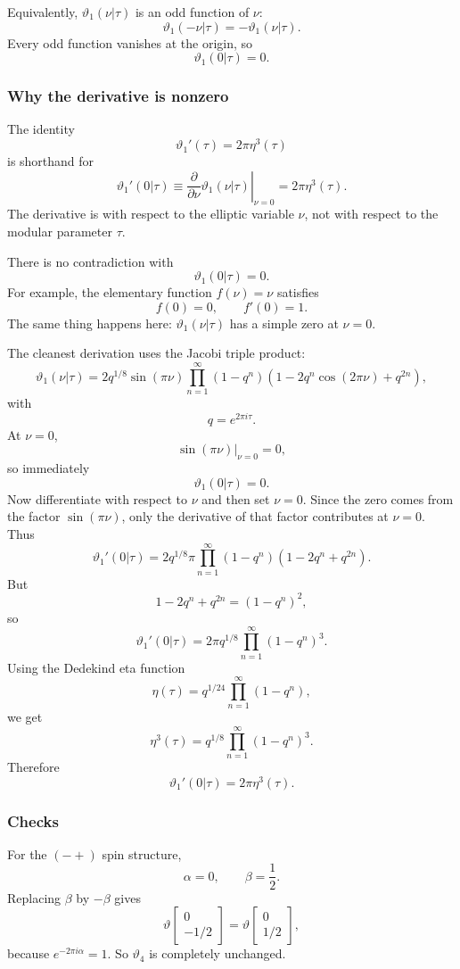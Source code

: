 \documentclass[
  10pt,
  a4paper,
  openany]{book}
\begin{document}
Equivalently, \(\vartheta_1(\nu|\tau)\) is an odd function of \(\nu\):
\[
\vartheta_1(-\nu|\tau)
=
-
\vartheta_1(\nu|\tau).
\] Every odd function vanishes at the origin, so \[
\vartheta_1(0|\tau)=0.
\]

\subsubsection{Why the derivative is
nonzero}\label{why-the-derivative-is-nonzero}

The identity \[
\vartheta_1'(\tau)=2\pi\eta^3(\tau)
\] is shorthand for \[
\vartheta_1'(0|\tau)
\equiv
\left.\frac{\partial}{\partial\nu}\vartheta_1(\nu|\tau)\right|_{\nu=0}
=
2\pi\eta^3(\tau).
\] The derivative is with respect to the elliptic variable \(\nu\), not
with respect to the modular parameter \(\tau\).

There is no contradiction with \[
\vartheta_1(0|\tau)=0.
\] For example, the elementary function \(f(\nu)=\nu\) satisfies \[
f(0)=0,
\qquad
f'(0)=1.
\] The same thing happens here: \(\vartheta_1(\nu|\tau)\) has a simple
zero at \(\nu=0\).

The cleanest derivation uses the Jacobi triple product: \[
\vartheta_1(\nu|\tau)
=
2q^{1/8}\sin(\pi\nu)
\prod_{n=1}^\infty
(1-q^n)
(1-2q^n\cos(2\pi\nu)+q^{2n}),
\] with \[
q=e^{2\pi i\tau}.
\] At \(\nu=0\), \[
\sin(\pi\nu)\big|_{\nu=0}=0,
\] so immediately \[
\vartheta_1(0|\tau)=0.
\] Now differentiate with respect to \(\nu\) and then set \(\nu=0\).
Since the zero comes from the factor \(\sin(\pi\nu)\), only the
derivative of that factor contributes at \(\nu=0\). Thus \[
\vartheta_1'(0|\tau)
=
2q^{1/8}\pi
\prod_{n=1}^\infty
(1-q^n)
(1-2q^n+q^{2n}).
\] But \[
1-2q^n+q^{2n}
=
(1-q^n)^2,
\] so \[
\vartheta_1'(0|\tau)
=
2\pi q^{1/8}
\prod_{n=1}^\infty
(1-q^n)^3.
\] Using the Dedekind eta function \[
\eta(\tau)
=
q^{1/24}
\prod_{n=1}^\infty(1-q^n),
\] we get \[
\eta^3(\tau)
=
q^{1/8}
\prod_{n=1}^\infty(1-q^n)^3.
\] Therefore \[
\boxed{
\vartheta_1'(0|\tau)
=
2\pi\eta^3(\tau).
}
\]

\subsubsection{Checks}\label{checks-2}

For the \((-+)\) spin structure, \[
\alpha=0,
\qquad
\beta=\frac{1}{2}.
\] Replacing \(\beta\) by \(-\beta\) gives \[
\vartheta\begin{bmatrix}
0\\
-1/2
\end{bmatrix}
=
\vartheta\begin{bmatrix}
0\\
1/2
\end{bmatrix},
\] because \(e^{-2\pi i\alpha}=1\). So \(\vartheta_4\) is completely
unchanged.
\end{document}

